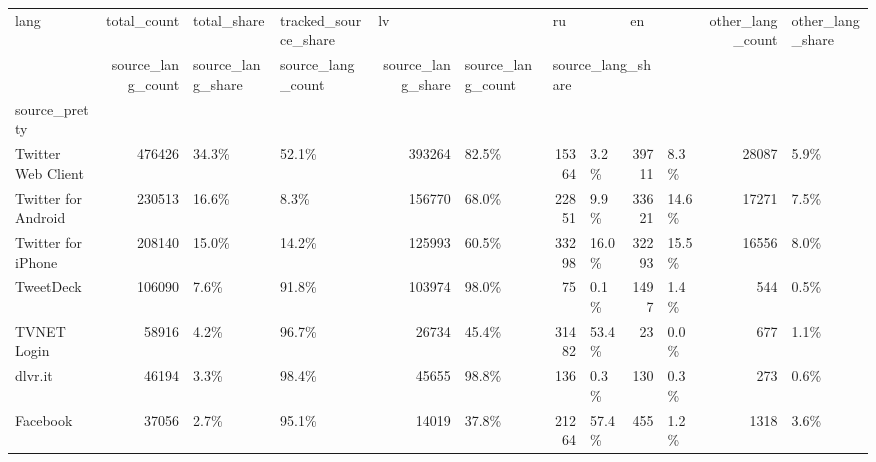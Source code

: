 \begin{tabular}{lrllrlrlrlrl}
\toprule
lang & total\_count & total\_share & tracked\_source\_share & \multicolumn{2}{l}{lv} & \multicolumn{2}{l}{ru} & \multicolumn{2}{l}{en} & other\_lang\_count & other\_lang\_share \\
{} & source\_lang\_count & source\_lang\_share & source\_lang\_count & source\_lang\_share & source\_lang\_count & \multicolumn{3}{l}{source\_lang\_share} \\
source\_pretty       &             &             &                      &                   &                   &                   &                   &                   &                   &                  &                  \\
\midrule
Twitter Web Client  &      476426 &       34.3\% &                52.1\% &            393264 &             82.5\% &             15364 &              3.2\% &             39711 &              8.3\% &            28087 &             5.9\% \\
Twitter for Android &      230513 &       16.6\% &                 8.3\% &            156770 &             68.0\% &             22851 &              9.9\% &             33621 &             14.6\% &            17271 &             7.5\% \\
Twitter for iPhone  &      208140 &       15.0\% &                14.2\% &            125993 &             60.5\% &             33298 &             16.0\% &             32293 &             15.5\% &            16556 &             8.0\% \\
TweetDeck           &      106090 &        7.6\% &                91.8\% &            103974 &             98.0\% &                75 &              0.1\% &              1497 &              1.4\% &              544 &             0.5\% \\
TVNET Login         &       58916 &        4.2\% &                96.7\% &             26734 &             45.4\% &             31482 &             53.4\% &                23 &              0.0\% &              677 &             1.1\% \\
dlvr.it             &       46194 &        3.3\% &                98.4\% &             45655 &             98.8\% &               136 &              0.3\% &               130 &              0.3\% &              273 &             0.6\% \\
Facebook            &       37056 &        2.7\% &                95.1\% &             14019 &             37.8\% &             21264 &             57.4\% &               455 &              1.2\% &             1318 &             3.6\% \\

\end{tabular}
